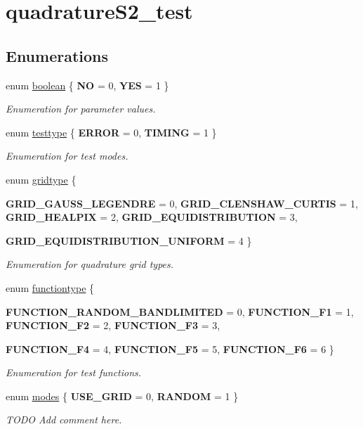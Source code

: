\hypertarget{group__applications__quadratureS2__test}{
\section{quadrature\-S2\_\-test}
\label{group__applications__quadratureS2__test}
}
\subsection*{Enumerations}
\begin{CompactItemize}
\item 
enum \hyperlink{group__applications__quadratureS2__test_ga1}{boolean} \{ {\bf NO} =  0, 
{\bf YES} =  1
 \}
\begin{CompactList}\small\item\em Enumeration for parameter values. \item\end{CompactList}\item 
enum \hyperlink{group__applications__quadratureS2__test_ga2}{testtype} \{ {\bf ERROR} =  0, 
{\bf TIMING} =  1
 \}
\begin{CompactList}\small\item\em Enumeration for test modes. \item\end{CompactList}\item 
enum \hyperlink{group__applications__quadratureS2__test_ga3}{gridtype} \{ \par
{\bf GRID\_\-GAUSS\_\-LEGENDRE} =  0, 
{\bf GRID\_\-CLENSHAW\_\-CURTIS} =  1, 
{\bf GRID\_\-HEALPIX} =  2, 
{\bf GRID\_\-EQUIDISTRIBUTION} =  3, 
\par
{\bf GRID\_\-EQUIDISTRIBUTION\_\-UNIFORM} =  4
 \}
\begin{CompactList}\small\item\em Enumeration for quadrature grid types. \item\end{CompactList}\item 
enum \hyperlink{group__applications__quadratureS2__test_ga4}{functiontype} \{ \par
{\bf FUNCTION\_\-RANDOM\_\-BANDLIMITED} =  0, 
{\bf FUNCTION\_\-F1} =  1, 
{\bf FUNCTION\_\-F2} =  2, 
{\bf FUNCTION\_\-F3} =  3, 
\par
{\bf FUNCTION\_\-F4} =  4, 
{\bf FUNCTION\_\-F5} =  5, 
{\bf FUNCTION\_\-F6} =  6
 \}
\begin{CompactList}\small\item\em Enumeration for test functions. \item\end{CompactList}\item 
enum \hyperlink{group__applications__quadratureS2__test_ga5}{modes} \{ {\bf USE\_\-GRID} =  0, 
{\bf RANDOM} =  1
 \}
\begin{CompactList}\small\item\em TODO Add comment here. \item\end{CompactList}\end{CompactItemize}
